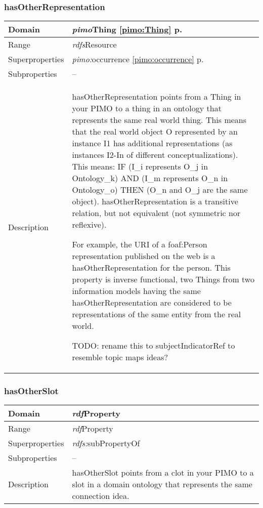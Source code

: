 \subsubsection{hasOtherRepresentation} 
\label{pimo:hasOtherRepresentation}
\begin{longtable}{|p{}|p{}|}
 \hline 
Domain & {\it pimo}\hspace{1pt}Thing \ref{pimo:Thing} p. \pageref{pimo:Thing}\\ \hline 
Range & {\it rdfs}\hspace{1pt}Resource\\ \hline 
Superproperties & {\it pimo:}occurrence \ref{pimo:occurrence} p. \pageref{pimo:occurrence}\\ \hline 
Subproperties & --\\ \hline 
Description & hasOtherRepresentation points from a Thing in your PIMO to a thing in an ontology that represents the same real world thing. 
This means that the real world object O represented by an instance I1 has additional representations (as instances I2-In of different conceptualizations).
This means: IF (I\_i represents O\_j in Ontology\_k) AND (I\_m represents O\_n in Ontology\_o) THEN (O\_n and O\_j are the same object).
hasOtherRepresentation is a transitive relation, but not equivalent (not symmetric nor reflexive).

For example, the URI of a  foaf:Person representation published on the web is a hasOtherRepresentation for the person. This property is inverse functional, two Things from two information models having the same hasOtherRepresentation are considered to be representations of the same entity from the real world.

TODO: rename this to subjectIndicatorRef to resemble topic maps ideas?\\ \hline 
\end{longtable}


\subsubsection{hasOtherSlot} 
\label{pimo:hasOtherSlot}
\begin{longtable}{|p{}|p{}|}
 \hline 
Domain & {\it rdf}\hspace{1pt}Property\\ \hline 
Range & {\it rdf}\hspace{1pt}Property\\ \hline 
Superproperties & {\it rdfs:}subPropertyOf\\ \hline 
Subproperties & --\\ \hline 
Description & hasOtherSlot points from a clot  in your PIMO to a slot in a domain ontology that represents the same connection idea.\\ \hline 
\end{longtable}


